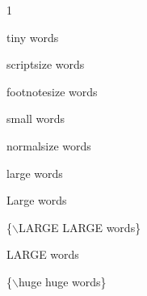 \documentclass[a4paper,portrait,12pt]{article}
\begin{document}
1





\begin{flushleft}
tiny words
\end{flushleft}





\begin{flushleft}
scriptsize words
\end{flushleft}





\begin{flushleft}
footnotesize words
\end{flushleft}





\begin{flushleft}
small words
\end{flushleft}





\begin{flushleft}
normalsize words
\end{flushleft}





\begin{flushleft}
large words
\end{flushleft}





\begin{flushleft}
Large words
\end{flushleft}





\begin{flushleft}
\{\ensuremath{\backslash}LARGE LARGE words\}
\end{flushleft}





\begin{flushleft}
LARGE words
\end{flushleft}





\begin{flushleft}
\{\ensuremath{\backslash}huge huge words\}
\end{flushleft}
\end{document}
